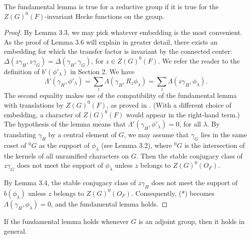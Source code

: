 \documentclass{amsart}
\newenvironment{cthm}[1]
  {\renewcommand\thethm{\sc #1}\thm}
  {\endthm}
\begin{document}
\begin{cthm}{Lemma 3.5}  The fundamental lemma is true for a reductive
group if it is true for the $Z(G)^0(F)$-invariant Hecke functions
on the group.
\end{cthm}

\begin{proof}  
By Lemma 3.3, we may pick whatever embedding is the most
convenient.  As the proof of Lemma 3.6 will explain in
greater detail, there exists an embedding for which
the transfer factor is invariant by the connected center:
$\Delta(z\gamma_H,z\gamma_G) = \Delta(\gamma_H,\gamma_G)$, for
$z\in Z(G)^0(F)$.
We refer the reader to the definition
of $b'(\phi'_\lambda)$ in Section 2.
We have
\begin{equation}\tag{*}
\Lambda'(\gamma_H,\phi'_\lambda) = \sum_z \Lambda(\gamma_H,R_z\phi_\lambda) =
\sum_z \Lambda(z\gamma_H,\phi_\lambda).
\end{equation}
The second equality makes use of the compatibility of the
fundamental lemma with translations by $Z(G)^0(F)$, as proved in
\cite{H2,11}.  (With a different choice of embedding, a character
of $Z(G)^0(F)$ would appear in the right-hand term.)
The hypothesis of the lemma means that $\Lambda'(\gamma_H,\phi'_\lambda)=0$,
for all $\lambda$.  By translating $\gamma_H$ by a central element
of $G$, 
we may assume that
$\gamma_G$ lies in the same coset of ${}^0\!G$ as the support of $\phi_\lambda$
(see Lemma 3.2),
where ${}^0\!G$ is the intersection of the kernels 
of all unramified characters on $G$.  
Then the stable
conjugacy class of $z\gamma_G$ does not meet the support of $\phi_\lambda$
unless $z$ belongs to $Z(G)^0(O_F)$.

By Lemma 3.4, the stable conjugacy class of $z\gamma_H$ 
does not meet the support of $b(\phi_\lambda)$
unless $z$ belongs to $Z(G)^0(O_F)$.  Consequently,
(*) becomes $\Lambda(\gamma_H,\phi_\lambda)=0$, and the fundamental
lemma holds.
\end{proof}


\begin{cthm}{Lemma 3.6}  If the fundamental lemma holds
whenever $G$ is an adjoint group, then it holds in
general.  \end{cthm}
\end{document}
